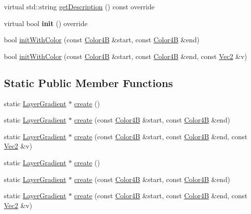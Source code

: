 \begin{DoxyCompactItemize}
\item 
virtual std\+::string \hyperlink{classLayerGradient_ace9ed0ed0422bdc89a7e440a9f8307d3}{get\+Description} () const override
\item 
\mbox{\label{classLayerGradient_aa4991fe3d8ba8f5193d176bedc67513b}} 
virtual bool {\bfseries init} () override
\item 
bool \hyperlink{classLayerGradient_a4525eb8334b09187ffcf99ece5b5b9e8}{init\+With\+Color} (const \hyperlink{structColor4B}{Color4B} \&start, const \hyperlink{structColor4B}{Color4B} \&end)
\item 
bool \hyperlink{classLayerGradient_abd19450a8badd0016dabdb6c3cf96f59}{init\+With\+Color} (const \hyperlink{structColor4B}{Color4B} \&start, const \hyperlink{structColor4B}{Color4B} \&end, const \hyperlink{classVec2}{Vec2} \&v)
\end{DoxyCompactItemize}
\subsection*{Static Public Member Functions}
\begin{DoxyCompactItemize}
\item 
static \hyperlink{classLayerGradient}{Layer\+Gradient} $\ast$ \hyperlink{classLayerGradient_a17fe9428e4f59c33f8e6eb8f8a97a5e9}{create} ()
\item 
static \hyperlink{classLayerGradient}{Layer\+Gradient} $\ast$ \hyperlink{classLayerGradient_afffde737ba66c49d82ee6b7ebb77cac3}{create} (const \hyperlink{structColor4B}{Color4B} \&start, const \hyperlink{structColor4B}{Color4B} \&end)
\item 
static \hyperlink{classLayerGradient}{Layer\+Gradient} $\ast$ \hyperlink{classLayerGradient_a6093b698c74a5773c202c5f0b3fd6ac3}{create} (const \hyperlink{structColor4B}{Color4B} \&start, const \hyperlink{structColor4B}{Color4B} \&end, const \hyperlink{classVec2}{Vec2} \&v)
\item 
static \hyperlink{classLayerGradient}{Layer\+Gradient} $\ast$ \hyperlink{classLayerGradient_af715c6b38e34ddb41cfa5a9a230cdf28}{create} ()
\item 
static \hyperlink{classLayerGradient}{Layer\+Gradient} $\ast$ \hyperlink{classLayerGradient_a06efc29db5ad6eee085053c19877d3e6}{create} (const \hyperlink{structColor4B}{Color4B} \&start, const \hyperlink{structColor4B}{Color4B} \&end)
\item 
static \hyperlink{classLayerGradient}{Layer\+Gradient} $\ast$ \hyperlink{classLayerGradient_a692edceda257a30b66584c32ec8b179f}{create} (const \hyperlink{structColor4B}{Color4B} \&start, const \hyperlink{structColor4B}{Color4B} \&end, const \hyperlink{classVec2}{Vec2} \&v)
\end{DoxyCompactItemize}
